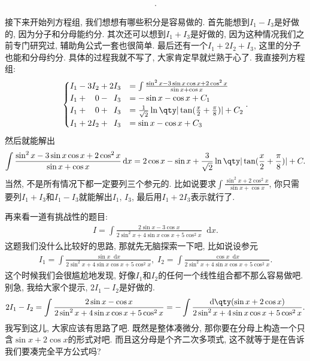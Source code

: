 \documentclass{ctexbook}
\newcommand*{\dif}{\mathop{}\!\mathrm{d}}
\begin{document}
{\begin{align*}
.\end{align*}\par
接下来开始列方程组, 我们想想有哪些积分是容易做的. 首先能想到$I_{1}-I_{3}$是好做的, 因为分子和分母能约分. 其次还可以想到$I_{1}+I_{3}$是好做的, 因为这种情况我们之前专门研究过, 辅助角公式一套也很简单. 最后还有一个$I_{1}+2I_{2}+I_{3}$, 这里的分子也能和分母约分. 具体的过程我就不写了, 大家肯定早就烂熟于心了. 我直接列方程组: 
\begin{align*}
\begin{cases}
I_{1}-3I_{2}+2I_{3}&=\int\frac{\sin^{2}{x}-3\sin{x}\cos{x}+2\cos^{2}{x}}{\sin{x}+\cos{x}}\\
I_{1}+\;\;\,\,0-\;\:I_{3}&=-\sin{x}-\cos{x}+C_{1}\\
I_{1}+\;\;\,\,0+\;\:I_{3}&=\frac{1}{\sqrt{2}}\ln\qty|\tan(\frac{x}{2}+\frac{\pi}{8})|+C_{2}\\
I_{1}+2I_{2}+\;\:I_{3}&=\sin{x}-\cos{x}+C_{3}
\end{cases}
.\end{align*}
然后就能解出
\begin{align*}
\int\frac{\sin^{2}{x}-3\sin{x}\cos{x}+2\cos^{2}{x}}{\sin{x}+\cos{x}}\dif{x}=2\cos{x}-\sin{x}+\frac{3}{\sqrt{2}}\ln\qty|\tan(\frac{x}{2}+\frac{\pi}{8})|+C
.\end{align*}
当然, 不是所有情况下都一定要列三个参元的. 比如说要求$\int\frac{\sin^{2}{x}+2\cos^{2}{x}}{\sin{x}+\cos{x}}$, 你只需要列$I_{1}+I_{3}$和$I_{1}-I_{3}$就能解出$I_{1},\,I_{3}$, 最后用$I_{1}+2I_{3}$表示就行了. \par
再来看一道有挑战性的题目: 
\begin{align*}
I=\int\frac{2\sin{x}-3\cos{x}}{2\sin^{2}{x}+4\sin{x}\cos{x}+5\cos^{2}{x}}\dif{x}
.\end{align*}
这题我们没什么比较好的思路, 那就先无脑探索一下吧, 比如说设参元
\begin{align*}
I_{1}=\int\frac{\sin{x}\dif{x}}{2\sin^{2}{x}+4\sin{x}\cos{x}+5\cos^{2}{x}},\;I_{2}=\int\frac{\cos{x}\dif{x}}{2\sin^{2}{x}+4\sin{x}\cos{x}+5\cos^{2}{x}}
.\end{align*}
这个时候我们会很尴尬地发现, 好像$I_{1}$和$I_{2}$的任何一个线性组合都不那么容易做吧. 别急, 我给大家个提示, $2I_{1}-I_{2}$是好做的. 
\begin{align*}
2I_{1}-I_{2}=\int\frac{2\sin{x}-\cos{x}}{2\sin^{2}{x}+4\sin{x}\cos{x}+5\cos^{2}{x}}=-\int\frac{\dif{\qty(\sin{x}+2\cos{x})}}{2\sin^{2}{x}+4\sin{x}\cos{x}+5\cos^{2}{x}}
.\end{align*}
我写到这儿, 大家应该有思路了吧. 既然是整体凑微分, 那你要在分母上构造一个只含$\sin{x}+2\cos{x}$的形式对吧. 而且这分母是个齐二次多项式, 这不就等于是在告诉我们要凑完全平方公式吗? 
}
\end{document}
